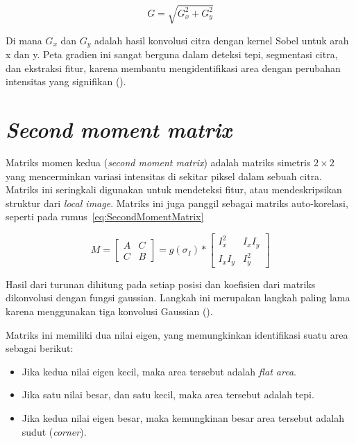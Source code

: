 \begin{equation}
  G = \sqrt{G_x^2 + G_y^2}
\end{equation}

  Di mana \(G_x\) dan \(G_y\) adalah hasil konvolusi citra dengan kernel Sobel untuk arah x dan y. Peta gradien ini sangat berguna dalam deteksi tepi, segmentasi citra, dan ekstraksi fitur, karena membantu mengidentifikasi area dengan perubahan intensitas yang signifikan (\cite[hlm. 306--307]{Sanchez2018}).

\section{\emph{Second moment matrix}}
  Matriks momen kedua (\emph{second moment matrix}) adalah matriks simetris \(2 \times 2\) yang mencerminkan variasi intensitas di sekitar piksel dalam sebuah citra. Matriks ini seringkali digunakan untuk mendeteksi fitur, atau mendeskripsikan struktur dari \emph{local image}.
Matriks ini juga panggil sebagai matriks auto-korelasi, seperti pada rumus~\ref{eq:SecondMomentMatrix}

\begin{equation}
  M = 
    \begin{bmatrix}
      A & C \\
      C & B
    \end{bmatrix}
    = g(\sigma_{I}) *
      \begin{bmatrix}
        I_{x}^2 & I_{x}I_{y} \\
        I_{x}I_{y} & I_{y}^2
      \end{bmatrix}
  \label{eq:SecondMomentMatrix}
\end{equation}

Hasil dari turunan dihitung pada setiap posisi dan koefisien dari matriks dikonvolusi dengan fungsi gaussian. Langkah ini merupakan langkah paling lama karena menggunakan tiga konvolusi Gaussian (\cite[hlm. 307]{Sanchez2018}). 

Matriks ini memiliki dua nilai eigen, yang memungkinkan identifikasi suatu area sebagai berikut:

\begin{itemize}
  \item Jika kedua nilai eigen kecil, maka area tersebut adalah \emph{flat area}.
  \item Jika satu nilai besar, dan satu kecil, maka area tersebut adalah tepi.
  \item Jika kedua nilai eigen besar, maka kemungkinan besar area tersebut adalah sudut (\emph{corner}).
\end{itemize}

